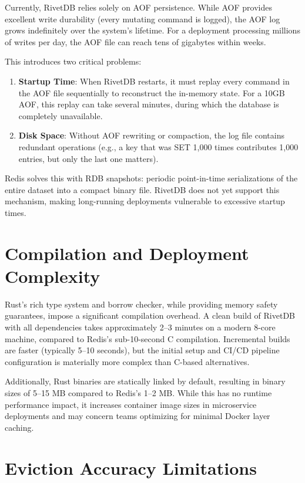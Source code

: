 Currently, RivetDB relies solely on AOF persistence. While AOF provides excellent write durability (every mutating command is logged), the AOF log grows indefinitely over the system's lifetime. For a deployment processing millions of writes per day, the AOF file can reach tens of gigabytes within weeks.

This introduces two critical problems:
\begin{enumerate}[leftmargin=2.5em]
    \item \textbf{Startup Time}: When RivetDB restarts, it must replay every command in the AOF file sequentially to reconstruct the in-memory state. For a 10GB AOF, this replay can take several minutes, during which the database is completely unavailable.
    \item \textbf{Disk Space}: Without AOF rewriting or compaction, the log file contains redundant operations (e.g., a key that was SET 1,000 times contributes 1,000 entries, but only the last one matters).
\end{enumerate}

Redis solves this with RDB snapshots: periodic point-in-time serializations of the entire dataset into a compact binary file. RivetDB does not yet support this mechanism, making long-running deployments vulnerable to excessive startup times.

\section{Compilation and Deployment Complexity}

Rust's rich type system and borrow checker, while providing memory safety guarantees, impose a significant compilation overhead. A clean build of RivetDB with all dependencies takes approximately 2--3 minutes on a modern 8-core machine, compared to Redis's sub-10-second C compilation. Incremental builds are faster (typically 5--10 seconds), but the initial setup and CI/CD pipeline configuration is materially more complex than C-based alternatives.

Additionally, Rust binaries are statically linked by default, resulting in binary sizes of 5--15 MB compared to Redis's 1--2 MB. While this has no runtime performance impact, it increases container image sizes in microservice deployments and may concern teams optimizing for minimal Docker layer caching.

\section{Eviction Accuracy Limitations}

